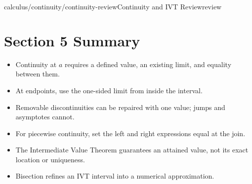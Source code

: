 \begin{webpage}{calculus/continuity/continuity-review}{Continuity and IVT Review}{review}
\section*{Section 5 Summary}

\begin{bgsummary}
\begin{itemize}
  \item Continuity at \(a\) requires a defined value, an existing limit, and equality between them.
  \item At endpoints, use the one-sided limit from inside the interval.
  \item Removable discontinuities can be repaired with one value; jumps and asymptotes cannot.
  \item For piecewise continuity, set the left and right expressions equal at the join.
  \item The Intermediate Value Theorem guarantees an attained value, not its exact location or uniqueness.
  \item Bisection refines an IVT interval into a numerical approximation.
\end{itemize}
\end{bgsummary}
\end{webpage}

